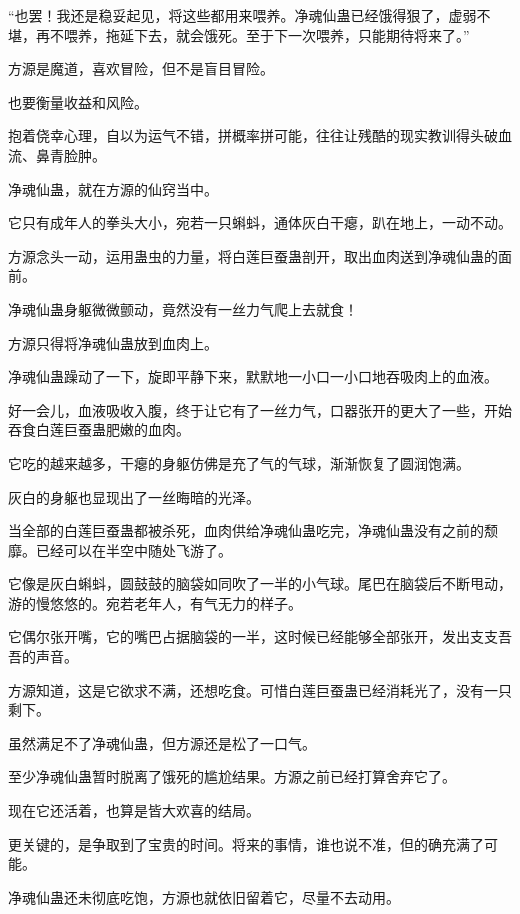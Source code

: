 
\begin{this_body}

“也罢！我还是稳妥起见，将这些都用来喂养。净魂仙蛊已经饿得狠了，虚弱不堪，再不喂养，拖延下去，就会饿死。至于下一次喂养，只能期待将来了。”

方源是魔道，喜欢冒险，但不是盲目冒险。

也要衡量收益和风险。

抱着侥幸心理，自以为运气不错，拼概率拼可能，往往让残酷的现实教训得头破血流、鼻青脸肿。

净魂仙蛊，就在方源的仙窍当中。

它只有成年人的拳头大小，宛若一只蝌蚪，通体灰白干瘪，趴在地上，一动不动。

方源念头一动，运用蛊虫的力量，将白莲巨蚕蛊剖开，取出血肉送到净魂仙蛊的面前。

净魂仙蛊身躯微微颤动，竟然没有一丝力气爬上去就食！

方源只得将净魂仙蛊放到血肉上。

净魂仙蛊躁动了一下，旋即平静下来，默默地一小口一小口地吞吸肉上的血液。

好一会儿，血液吸收入腹，终于让它有了一丝力气，口器张开的更大了一些，开始吞食白莲巨蚕蛊肥嫩的血肉。

它吃的越来越多，干瘪的身躯仿佛是充了气的气球，渐渐恢复了圆润饱满。

灰白的身躯也显现出了一丝晦暗的光泽。

当全部的白莲巨蚕蛊都被杀死，血肉供给净魂仙蛊吃完，净魂仙蛊没有之前的颓靡。已经可以在半空中随处飞游了。

它像是灰白蝌蚪，圆鼓鼓的脑袋如同吹了一半的小气球。尾巴在脑袋后不断甩动，游的慢悠悠的。宛若老年人，有气无力的样子。

它偶尔张开嘴，它的嘴巴占据脑袋的一半，这时候已经能够全部张开，发出支支吾吾的声音。

方源知道，这是它欲求不满，还想吃食。可惜白莲巨蚕蛊已经消耗光了，没有一只剩下。

虽然满足不了净魂仙蛊，但方源还是松了一口气。

至少净魂仙蛊暂时脱离了饿死的尴尬结果。方源之前已经打算舍弃它了。

现在它还活着，也算是皆大欢喜的结局。

更关键的，是争取到了宝贵的时间。将来的事情，谁也说不准，但的确充满了可能。

净魂仙蛊还未彻底吃饱，方源也就依旧留着它，尽量不去动用。


\end{this_body}
